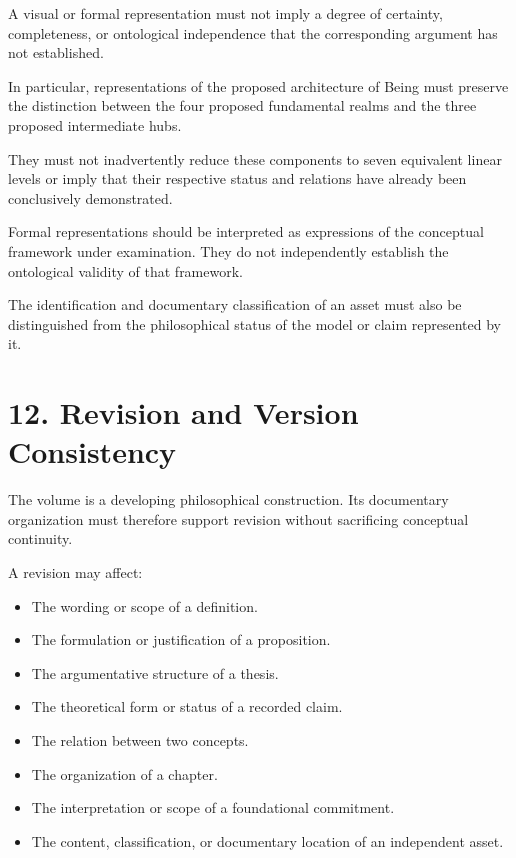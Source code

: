 A visual or formal representation must not imply
a degree of certainty, completeness, or ontological
independence that the corresponding argument
has not established.

In particular, representations of the proposed
architecture of Being must preserve the distinction
between the four proposed fundamental realms
and the three proposed intermediate hubs.

They must not inadvertently reduce these
components to seven equivalent linear levels
or imply that their respective status and
relations have already been conclusively
demonstrated.

Formal representations should be interpreted
as expressions of the conceptual framework
under examination. They do not independently
establish the ontological validity of that
framework.

The identification and documentary classification
of an asset must also be distinguished from
the philosophical status of the model or
claim represented by it.


\section*{12. Revision and Version Consistency}

The volume is a developing philosophical
construction. Its documentary organization
must therefore support revision without
sacrificing conceptual continuity.

A revision may affect:

\begin{itemize}
    \item The wording or scope of a definition.
    \item The formulation or justification
    of a proposition.
    \item The argumentative structure of a thesis.
    \item The theoretical form or status of
    a recorded claim.
    \item The relation between two concepts.
    \item The organization of a chapter.
    \item The interpretation or scope of a
    foundational commitment.
    \item The content, classification, or
    documentary location of an independent asset.
\end{itemize}

